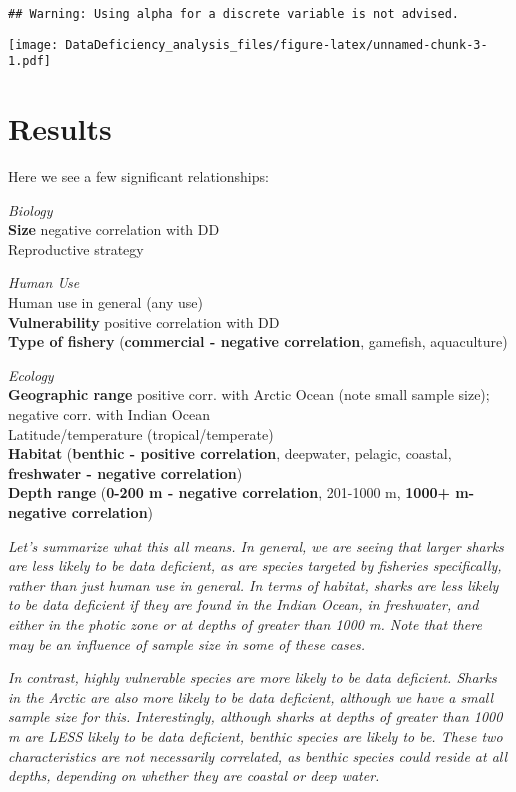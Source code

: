 \documentclass[]{article}
\begin{document}
\begin{verbatim}
## Warning: Using alpha for a discrete variable is not advised.
\end{verbatim}

\texttt{[image: DataDeficiency\_analysis\_files/figure-latex/unnamed-chunk-3-1.pdf]}

\section{Results}\label{results}

Here we see a few significant relationships:

\emph{Biology}\\
\textbf{Size} negative correlation with DD\\
Reproductive strategy

\emph{Human Use}\\
Human use in general (any use)\\
\textbf{Vulnerability} positive correlation with DD\\
\textbf{Type of fishery} (\textbf{commercial - negative correlation},
gamefish, aquaculture)

\emph{Ecology}\\
\textbf{Geographic range} positive corr. with Arctic Ocean (note small
sample size); negative corr. with Indian Ocean\\
Latitude/temperature (tropical/temperate)\\
\textbf{Habitat} (\textbf{benthic - positive correlation}, deepwater,
pelagic, coastal, \textbf{freshwater - negative correlation})\\
\textbf{Depth range} (\textbf{0-200 m - negative correlation}, 201-1000
m, \textbf{1000+ m- negative correlation})

\emph{Let's summarize what this all means. In general, we are seeing
that larger sharks are less likely to be data deficient, as are species
targeted by fisheries specifically, rather than just human use in
general. In terms of habitat, sharks are less likely to be data
deficient if they are found in the Indian Ocean, in freshwater, and
either in the photic zone or at depths of greater than 1000 m. Note that
there may be an influence of sample size in some of these cases.}

\emph{In contrast, highly vulnerable species are more likely to be data
deficient. Sharks in the Arctic are also more likely to be data
deficient, although we have a small sample size for this. Interestingly,
although sharks at depths of greater than 1000 m are LESS likely to be
data deficient, benthic species are likely to be. These two
characteristics are not necessarily correlated, as benthic species could
reside at all depths, depending on whether they are coastal or deep
water.}
\end{document}
